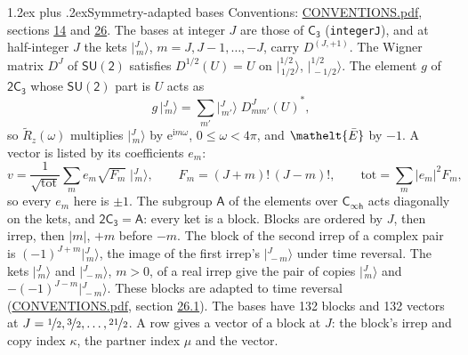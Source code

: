 \documentclass[10pt,a4paper]{article}
\makeatletter
\renewcommand\section{\@startsection{section}{1}{\z@}{-3ex plus -1ex minus -.2ex}%
  {1.2ex plus .2ex}{\normalfont\large\sffamily\bfseries\color{parttitle}}}
\numberwithin{equation}{section}
\newcommand{\eltfont}[1]{{\let\sigma\eltsigma\mathelt{#1}}}
\newcommand{\grp}[1]{\mathsf{#1}}
\newcommand{\elt}[1]{\eltfont{#1}}
\newcommand{\iunit}{\mathrm{i}}
\newcommand{\expe}{\mathrm{e}}
\newcommand{\irrJp}[2]{D^{(#1,#2)}}
\newcommand{\wignerD}[1]{D^{#1}}
\newcommand{\conj}[1]{{#1}^{*}}
\newcommand{\mult}{\kappa}
\newcommand{\intx}{\mu}
\newcommand{\jm}[2]{\bigl\lvert{}^{#1}_{\,#2}\bigr\rangle}
\newcommand{\barred}[1]{\bar{#1}}
\newcommand{\lift}[1]{\tilde{#1}}
\makeatother
\begin{document}
\section{Symmetry-adapted bases}\label{s:bases}
Conventions: \href{../../CONVENTIONS.pdf}{CONVENTIONS.pdf}, sections \href{../../../rotation/CONVENTIONS.pdf\#conv.14}{14} and \href{../../CONVENTIONS.pdf\#conv.26}{26}.
\leavevmode\label{n:index.m}\label{n:vector.ket}The bases at integer $J$ are those of \href{../../../rotation/data/pdf/C3.pdf}{$\grp{C_{3}}$} (\texttt{integerJ}), and at half-integer $J$ the kets $\jm{J}{m}$, $m = J, J-1, \dots, -J$, carry $\irrJp{J}{+1}$. \label{n:matrix.wigner}The Wigner matrix $\wignerD{J}$ of $\grp{SU(2)}$ satisfies $\wignerD{1/2}(U) = U$ on $\jm{1/2}{1/2}$, $\jm{1/2}{-1/2}$. The element $g$ of $\grp{2C_{3}}$ whose $\grp{SU(2)}$ part is $U$ acts as
\begin{equation}\label{e:action}g\,\jm{J}{m} = \sum_{m'} \jm{J}{m'}\; \conj{\wignerD{J}_{m m'}(U)},\end{equation}
so $\lift{R}_{z}(\omega)$ multiplies $\jm{J}{m}$ by $\expe^{\iunit m\omega}$, $0 \le \omega < 4\pi$, and $\elt{\barred{E}}$ by $-1$. \label{n:index.ketcoefficient}\label{n:vector.basis.symmetry}\label{n:index.ketweight}\label{n:index.total}A vector is listed by its coefficients $e_m$:
\begin{equation}\label{e:ket}v = \frac{1}{\sqrt{\mathrm{tot}}}\sum_m e_m\sqrt{F_m}\;\jm{J}{m},\qquad F_m = (J+m)!\,(J-m)!,\qquad \mathrm{tot} = \sum_m |e_m|^2F_m,\end{equation}
so every $e_m$ here is $\pm 1$.
\leavevmode\label{n:group.A}The subgroup $\grp{A}$ of the elements over $\grp{C_{\infty h}}$ acts diagonally on the kets, and $\grp{2C_{3}} = \grp{A}$: every ket is a block. Blocks are ordered by $J$, then irrep, then $|m|$, $+m$ before $-m$. The block of the second irrep of a complex pair is $(-1)^{J+m}\jm{J}{m}$, the image of the first irrep's $\jm{J}{-m}$ under time reversal. The kets $\jm{J}{m}$ and $\jm{J}{-m}$, $m > 0$, of a real irrep give the pair of copies $\jm{J}{m}$ and $-(-1)^{J-m}\jm{J}{-m}$. These blocks are adapted to time reversal (\href{../../CONVENTIONS.pdf}{CONVENTIONS.pdf}, section \href{../../CONVENTIONS.pdf\#conv.26.1}{26.1}).
The bases have 132 blocks and 132 vectors at $J = \nicefrac{1}{2}, \nicefrac{3}{2}, \dots, \nicefrac{21}{2}$. \label{n:index.copy}\label{n:head.vector}A row gives a vector of a block at $J$: the block's irrep and copy index $\mult$, the partner index $\intx$ and the vector.
\end{document}
